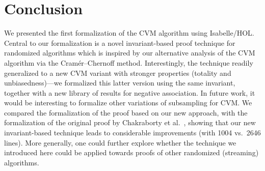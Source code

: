 \section{Conclusion}\label{sec:conclusion}
We presented the first formalization of the CVM algorithm using Isabelle/HOL.
Central to our formalization is a novel invariant-based proof technique for randomized algorithms which is inspired by our alternative analysis of the CVM algorithm via the Cram\'{e}r--Chernoff method.
Interestingly, the technique readily generalized to a new CVM variant with stronger properties (totality and unbiasedness)---we formalized this latter version using the same invariant, together with a new library of results for negative association.
In future work, it would be interesting to formalize other variations of subsampling for CVM.
We compared the formalization of the proof based on our new approach, with the formalization of the original proof by Chakraborty et al.~\cite{chakraborty2023}, showing that our new invariant-based technique leads to considerable improvements (with 1004 vs.~2646 lines).
More generally, one could further explore whether the technique we introduced here could be applied towards proofs of other randomized (streaming) algorithms.
